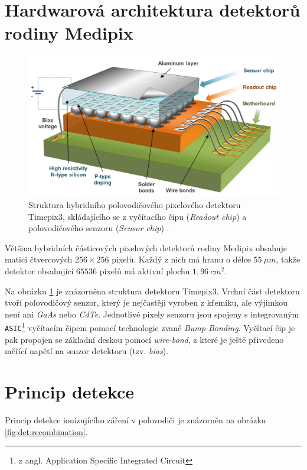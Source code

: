 \section{Hardwarová architektura detektorů rodiny Medipix}
\begin{figure}[th]
	\begin{center}
		\includegraphics[width=12cm]{figures/det_chip.png}
		\caption{Struktura hybridního polovodičového pixelového detektoru Timepix3, skládajícího se z vyčítacího čipu (\textit{Readout chip}) a polovodičového senzoru (\textit{Sensor chip}) \cite{PlatkevicDisertace}.}
		\label{fig:det:chip}
	\end{center}
\end{figure}
Většina hybridních částicových pixelových detektorů rodiny Medipix obsahuje matici čtvercových $256\times256$ pixelů. Každý z nich má hranu o délce $55~\mu m$, takže detektor obsahující $65536$ pixelů má aktivní plochu $1,96~cm^2$. 

Na obrázku \ref{fig:det:chip} je znázorněna struktura detektoru Timepix3. Vrchní část detektoru tvoří polovodičový senzor, který je nejčastěji vyroben z křemíku, ale výjimkou není ani \textit{GaAs} nebo \textit{CdTe}. Jednotlivé pixely senzoru jsou spojeny s integrovaným \texttt{ASIC}\footnote{z angl. Application Specific Integrated Circuit} vyčítacím čipem pomocí technologie zvané \textit{Bump-Bonding}. Vyčítací čip je pak propojen se základní deskou pomocí \textit{wire-bond}, z které je ještě přivedeno měřící napětí na senzor detektoru (tzv. \textit{bias}).


\section{Princip detekce}\label{chap:detectors:princip}
Princip detekce ionizujícího záření v polovodiči je znázorněn na obrázku \ref{fig:det:recombination}.

